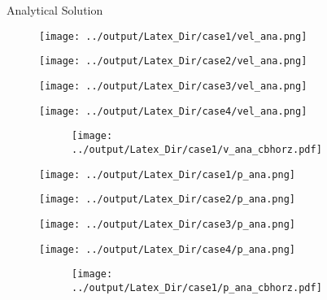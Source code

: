 \documentclass[10pt,aspectratio=169]{beamer}
\begin{document}
\begin{frame}{Analytical Solution}
	\vspace{-0.32in}
	\begin{figure}[!htb]
		\begin{multicols}{4}
			\texttt{[image: ../output/Latex\_Dir/case1/vel\_ana.png]}\par
			\hspace{0.75in}
			\texttt{[image: ../output/Latex\_Dir/case2/vel\_ana.png]}\par
			\hspace{1.5in}
			\texttt{[image: ../output/Latex\_Dir/case3/vel\_ana.png]}\par
			\hspace{2.25in}
			\texttt{[image: ../output/Latex\_Dir/case4/vel\_ana.png]}
		\end{multicols}
		\vspace{-0.29in}
		\begin{figure}
			\hspace{0.1in} 
			\texttt{[image: ../output/Latex\_Dir/case1/v\_ana\_cbhorz.pdf]}
		\end{figure}
	\end{figure}
	
	\begin{figure}[!htb]
		\vspace{-0.5in}
		\begin{multicols}{4}
			\texttt{[image: ../output/Latex\_Dir/case1/p\_ana.png]}\par
			\hspace{0.75in}
			\texttt{[image: ../output/Latex\_Dir/case2/p\_ana.png]}\par
			\hspace{1.5in}
			\texttt{[image: ../output/Latex\_Dir/case3/p\_ana.png]}\par
			\hspace{2.25in}
			\texttt{[image: ../output/Latex\_Dir/case4/p\_ana.png]}
		\end{multicols}
		\vspace{-0.27in}
		\begin{figure}
			\hspace{0.1in} 
			\texttt{[image: ../output/Latex\_Dir/case1/p\_ana\_cbhorz.pdf]}
		\end{figure}
	\end{figure}
\end{frame}
\end{document}
